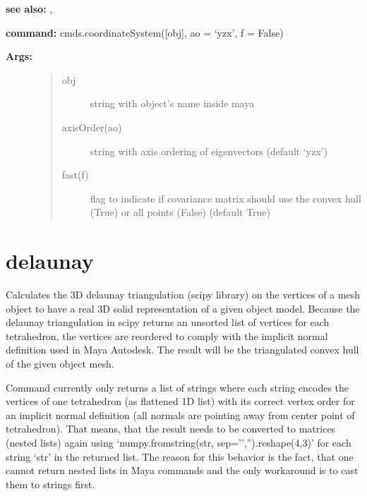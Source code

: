 \documentclass[letterpaper,10pt,english]{sphinxmanual}
\begin{document}
\textbf{see also:} {\hyperref[pk_src.normalize:normalize]{}}, {\hyperref[pk_src.exportData:exportdata]{}}

\textbf{command:} cmds.coordinateSystem({[}obj{]}, ao = `yzx', f = False)
\begin{description}
\item[{\textbf{Args:}}] \leavevmode\begin{quote}\begin{description}
\item[{obj}] \leavevmode
string with object's name inside maya

\item[{axisOrder(ao)}] \leavevmode
string with axis ordering of eigenvectors (default `yzx')

\item[{fast(f)}] \leavevmode
flag to indicate if covariance matrix should use the convex hull (True) or all points (False) (default True)

\end{description}\end{quote}

\end{description}


\section{delaunay}
\label{pk_src.delaunay:delaunay}\label{pk_src.delaunay::doc}\label{pk_src.delaunay:id1}
{\hyperref[index:commands]{}}
\label{pk_src.delaunay:module-pk_src.delaunay}
Calculates the 3D delaunay triangulation (scipy library) on the vertices of a mesh object to have a real 3D solid representation of a given object model. Because the delaunay triangulation in scipy returns an unsorted list of vertices for each tetrahedron, the vertices are reordered to comply with the implicit normal definition used in Maya Autodesk. The result will be the triangulated convex hull of the given object mesh.

Command currently only returns a list of strings where each string encodes the vertices of one tetrahedron (as flattened 1D list) with its correct vertex order for an implicit normal definition (all normals are pointing away from center point of tetrahedron). That means, that the result needs to be converted to matrices (nested lists) again using `numpy.fromstring(str, sep='','').reshape(4,3)' for each string `str' in the returned list. The reason for this behavior is the fact, that one cannot return nested lists in Maya commands and the only workaround is to cast them to strings first.
\end{document}
